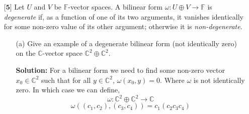 \documentclass[12pt]{article}
\newcommand      {\Cm}         {{\mathbb C}}
\begin{document}
\begin{itemize}
\begin{proof}
        Now we know from class that $U\oplus V \cong V\oplus U$

        Therefore $V\oplus V^*$ is isomoprhic to $V^* \oplus V$. 

        From here we have the natural ismoprhism we talked about before just a little different in that we can define the map $y\in V^*$ to itself in $V^*$ and then for $x_0$ in $V$ to $[x_0,y]$ in $V^{**}$. Meaning $W$ is indeed isomorphic to $W^*$

        But this is really all that the correspondence given is doing, simply taking $(x_0,y)\in V^* \oplus V$ and sending it to $(y,x_0)\in V^*\oplus V^{**}$
        
        We know that the dual of any finite vector space has the same dimension as the original vector space. So in order to prove the ismorphism we simply need to prove injectivity. 

        Let's refer to the correspondence as $\pi$. We know that the kernal of $\pi$ will be zero because if $\pi(x,y) = (y,x) = (0,0)$ both $y$ and $x$ would have to be 0. Thus the map is indeed injective, meaning it is isomorphic. 

        

        
    \end{proof}
    
    
    \item[$\textbf{[5]}$]
    Let $U$ and $V$ be $\mathbb{F}$-vector spaces. A bilinear form $\omega: U \oplus V \rightarrow \mathbb{F}$ is \textit{degenerate} if, as a function of one of its two arguments, it vanishes identically for some non-zero value of its other argument; otherwise it is \textit{non-degenerate}.
    \begin{itemize}
    
    \vspace{.3cm}
    \item[(a)]
    Give an example of a degenerate bilinear form (not identically zero) on the $\mathbb{C}$-vector space $\mathbb{C}^2 \oplus \mathbb{C}^2$.
    
    \textbf{Solution:}
    For a bilinear form we need to find some non-zero vector $x_0\in \Cm^2$ such that for all $y\in \Cm^2$, $\omega(x_0,y) = 0$. Where $\omega$ is not identically zero. In which case we can define,
    \[\omega: \Cm^2 \oplus \Cm^2 \to \Cm\]
    \[\omega((c_1,c_2),(c_3,c_4)) = c_1 (c_2c_3c_4) \]


\end{itemize}
\end{itemize}
\end{document}
